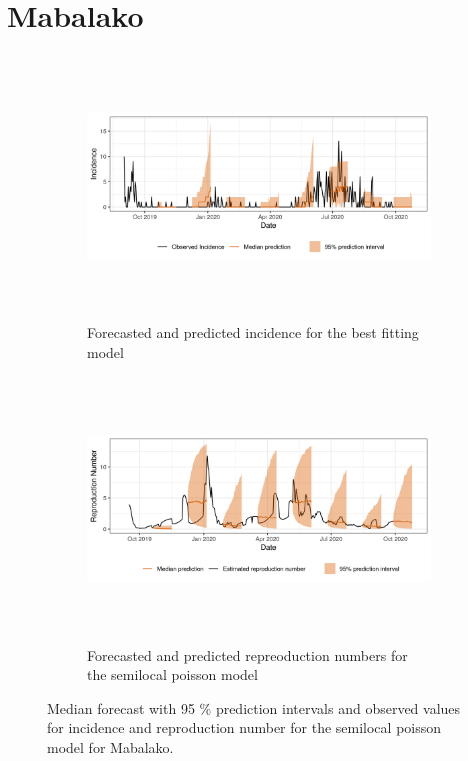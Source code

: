  \section{ Mabalako }\begin{figure}[H]\begin{subfigure}{\textwidth}  \centering  \includegraphics[width=0.9\linewidth, height=7cm]{../output/Mabalako_predictions.png}  \caption{Forecasted and predicted incidence for the best fitting model}\end{subfigure}

\begin{subfigure}{\textwidth}  \centering  \includegraphics[width=0.9\linewidth, height=7cm]{../output/Mabalako_Rs.png}  \caption{Forecasted and predicted repreoduction numbers for the semilocal poisson model}\end{subfigure}  \caption{Median forecast with 95 \% prediction intervals and observed values for incidence and reproduction number for the semilocal poisson model for Mabalako.}\end{figure}

